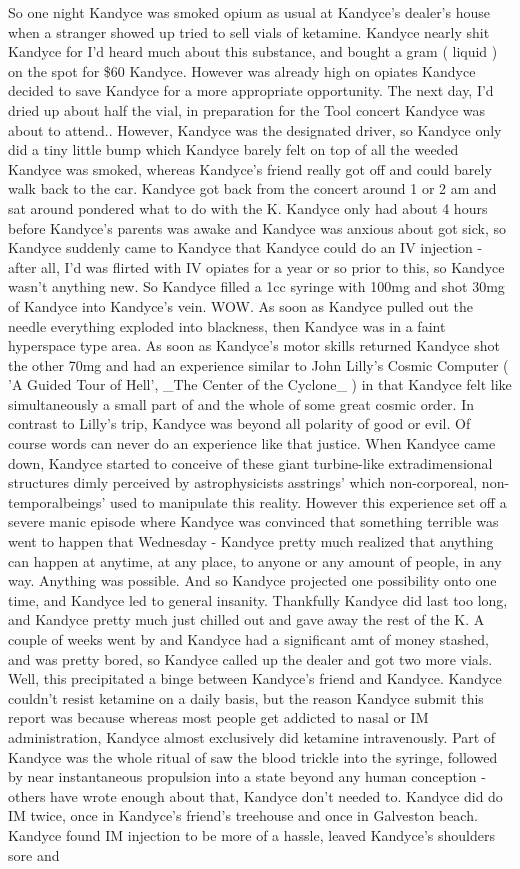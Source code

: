\documentclass[12pt]{book}
\begin{document}
So one night Kandyce was smoked opium as usual at Kandyce's dealer's house when a stranger showed up tried to sell vials of ketamine. Kandyce nearly shit Kandyce for I'd heard much about this substance, and bought a gram ( liquid ) on the spot for \$60 Kandyce. However was already high on opiates Kandyce decided to save Kandyce for a more appropriate opportunity. The next day, I'd dried up about half the vial, in preparation for the Tool concert Kandyce was about to attend.. However, Kandyce was the designated driver, so Kandyce only did a tiny little bump which Kandyce barely felt on top of all the weeded Kandyce was smoked, whereas Kandyce's friend really got off and could barely walk back to the car. Kandyce got back from the concert around 1 or 2 am and sat around pondered what to do with the K. Kandyce only had about 4 hours before Kandyce's parents was awake and Kandyce was anxious about got sick, so Kandyce suddenly came to Kandyce that Kandyce could do an IV injection - after all, I'd was flirted with IV opiates for a year or so prior to this, so Kandyce wasn't anything new. So Kandyce filled a 1cc syringe with 100mg and shot 30mg of Kandyce into Kandyce's vein. WOW. As soon as Kandyce pulled out the needle everything exploded into blackness, then Kandyce was in a faint hyperspace type area. As soon as Kandyce's motor skills returned Kandyce shot the other 70mg and had an experience similar to John Lilly's Cosmic Computer ( 'A Guided Tour of Hell', \_The Center of the Cyclone\_ ) in that Kandyce felt like simultaneously a small part of and the whole of some great cosmic order. In contrast to Lilly's trip, Kandyce was beyond all polarity of good or evil. Of course words can never do an experience like that justice. When Kandyce came down, Kandyce started to conceive of these giant turbine-like extradimensional structures dimly perceived by astrophysicists asstrings' which non-corporeal, non-temporalbeings' used to manipulate this reality. However this experience set off a severe manic episode where Kandyce was convinced that something terrible was went to happen that Wednesday - Kandyce pretty much realized that anything can happen at anytime, at any place, to anyone or any amount of people, in any way. Anything was possible. And so Kandyce projected one possibility onto one time, and Kandyce led to general insanity. Thankfully Kandyce did last too long, and Kandyce pretty much just chilled out and gave away the rest of the K. A couple of weeks went by and Kandyce had a significant amt of money stashed, and was pretty bored, so Kandyce called up the dealer and got two more vials. Well, this precipitated a binge between Kandyce's friend and Kandyce. Kandyce couldn't resist ketamine on a daily basis, but the reason Kandyce submit this report was because whereas most people get addicted to nasal or IM administration, Kandyce almost exclusively did ketamine intravenously. Part of Kandyce was the whole ritual of saw the blood trickle into the syringe, followed by near instantaneous propulsion into a state beyond any human conception - others have wrote enough about that, Kandyce don't needed to. Kandyce did do IM twice, once in Kandyce's friend's treehouse and once in Galveston beach. Kandyce found IM injection to be more of a hassle, leaved Kandyce's shoulders sore and 
\end{document}
